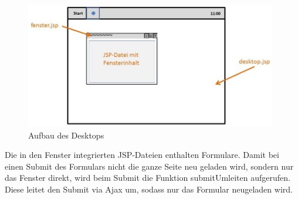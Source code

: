 \documentclass[12pt, a4paper]{article}
\begin{document}
\begin{figure}[H]
	\begin{center}
		\includegraphics[width=110mm]{Bilder/desktop.jpg}
	\end{center}
	\caption{Aufbau des Desktops}
\end{figure}

Die in den Fenster integrierten JSP-Dateien enthalten Formulare. Damit bei einen Submit des Formulars nicht die ganze Seite neu geladen wird, sondern nur das Fenster direkt, wird beim Submit die Funktion \glqq submitUmleiten\grqq{} aufgerufen. Diese leitet den Submit via Ajax um, sodass nur das Formular neugeladen wird.





\end{document}
